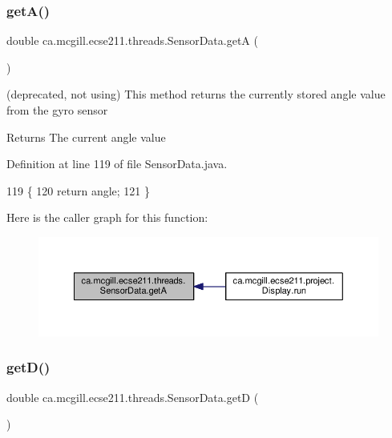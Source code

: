 \subsubsection{\texorpdfstring{get\+A()}{getA()}}
{\footnotesize\ttfamily double ca.\+mcgill.\+ecse211.\+threads.\+Sensor\+Data.\+getA (\begin{DoxyParamCaption}{ }\end{DoxyParamCaption})}

(deprecated, not using) This method returns the currently stored angle value from the gyro sensor

\begin{DoxyReturn}{Returns}
The current angle value 
\end{DoxyReturn}


Definition at line 119 of file Sensor\+Data.\+java.


\begin{DoxyCode}
119                        \{
120     \textcolor{keywordflow}{return} angle;
121   \}
\end{DoxyCode}
Here is the caller graph for this function\+:\nopagebreak
\begin{figure}[H]
\begin{center}
\leavevmode
\includegraphics[width=350pt]{classca_1_1mcgill_1_1ecse211_1_1threads_1_1_sensor_data_acc8f6cc56f39c8ea6b812cd8b135eca6_icgraph}
\end{center}
\end{figure}
\mbox{\label{classca_1_1mcgill_1_1ecse211_1_1threads_1_1_sensor_data_a46cc30522719018a80f89624e0ce458f}} 
\subsubsection{\texorpdfstring{get\+D()}{getD()}}
{\footnotesize\ttfamily double ca.\+mcgill.\+ecse211.\+threads.\+Sensor\+Data.\+getD (\begin{DoxyParamCaption}{ }\end{DoxyParamCaption})}

